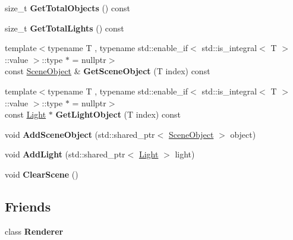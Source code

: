 \begin{DoxyCompactItemize}
\item 
\hypertarget{class_scene_a23da430906feb967d70195ef26ba7a88}{}size\+\_\+t {\bfseries Get\+Total\+Objects} () const \label{class_scene_a23da430906feb967d70195ef26ba7a88}

\item 
\hypertarget{class_scene_ab9d522852e85884def3d10600106d724}{}size\+\_\+t {\bfseries Get\+Total\+Lights} () const \label{class_scene_ab9d522852e85884def3d10600106d724}

\item 
\hypertarget{class_scene_acfd7dbaefb2feb8233d2a07d497542d7}{}{\footnotesize template$<$typename T , typename std\+::enable\+\_\+if$<$ std\+::is\+\_\+integral$<$ T $>$\+::value $>$\+::type $\ast$  = nullptr$>$ }\\const \hyperlink{class_scene_object}{Scene\+Object} \& {\bfseries Get\+Scene\+Object} (T index) const \label{class_scene_acfd7dbaefb2feb8233d2a07d497542d7}

\item 
\hypertarget{class_scene_abb610e4c698b3c2ebfb922b5352eba36}{}{\footnotesize template$<$typename T , typename std\+::enable\+\_\+if$<$ std\+::is\+\_\+integral$<$ T $>$\+::value $>$\+::type $\ast$  = nullptr$>$ }\\const \hyperlink{class_light}{Light} $\ast$ {\bfseries Get\+Light\+Object} (T index) const \label{class_scene_abb610e4c698b3c2ebfb922b5352eba36}

\item 
\hypertarget{class_scene_a6e51f14c74c252d231b73d7109b8117e}{}void {\bfseries Add\+Scene\+Object} (std\+::shared\+\_\+ptr$<$ \hyperlink{class_scene_object}{Scene\+Object} $>$ object)\label{class_scene_a6e51f14c74c252d231b73d7109b8117e}

\item 
\hypertarget{class_scene_ab9b1a906b16bf867600fc3f5b734c1d4}{}void {\bfseries Add\+Light} (std\+::shared\+\_\+ptr$<$ \hyperlink{class_light}{Light} $>$ light)\label{class_scene_ab9b1a906b16bf867600fc3f5b734c1d4}

\item 
\hypertarget{class_scene_ac3b0f6126be07f78a61abfac3487e4df}{}void {\bfseries Clear\+Scene} ()\label{class_scene_ac3b0f6126be07f78a61abfac3487e4df}

\end{DoxyCompactItemize}
\subsection*{Friends}
\begin{DoxyCompactItemize}
\item 
\hypertarget{class_scene_a70538530bc36e033e360880ef311df61}{}class {\bfseries Renderer}\label{class_scene_a70538530bc36e033e360880ef311df61}

\end{DoxyCompactItemize}



